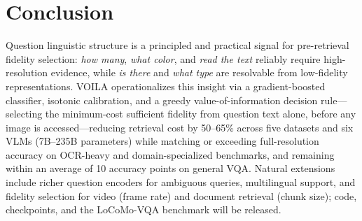 
\section{Conclusion}

Question linguistic structure is a principled and practical signal for pre-retrieval fidelity selection: \emph{how many}, \emph{what color}, and \emph{read the text} reliably require high-resolution evidence, while \emph{is there} and \emph{what type} are resolvable from low-fidelity representations.
\textsc{VOILA} operationalizes this insight via a gradient-boosted classifier, isotonic calibration, and a greedy value-of-information decision rule---selecting the minimum-cost sufficient fidelity from question text alone, before any image is accessed---reducing retrieval cost by 50--65\% across five datasets and six VLMs (7B--235B parameters) while matching or exceeding full-resolution accuracy on OCR-heavy and domain-specialized benchmarks, and remaining within an average of 10 accuracy points on general VQA.
Natural extensions include richer question encoders for ambiguous queries, multilingual support, and fidelity selection for video (frame rate) and document retrieval (chunk size); code, checkpoints, and the LoCoMo-VQA benchmark will be released.
